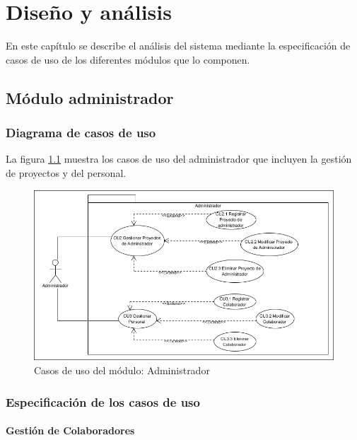 \chapter{Diseño y análisis} \label{cap:diez}

En este capítulo se describe el análisis del sistema mediante la especificación de casos de uso de los diferentes módulos que lo componen.\\
\newpage

\section{Módulo administrador}
\subsection{Diagrama de casos de uso}

	La figura \ref{fig:moduloAdminCU} muestra los casos de uso del administrador que incluyen la gestión de proyectos y del personal.
	
	\begin{figure}[H]
		\begin{center}
			\includegraphics[angle=0,width=.8\textwidth]{images/Diagramas/moduloAdmin}
			\caption{Casos de uso del módulo: Administrador}
			\label{fig:moduloAdminCU}
		\end{center}
	\end{figure}
	\newpage

\subsection{Especificación de los casos de uso}
\subsubsection{Gestión de Colaboradores}
	
	
	
	
